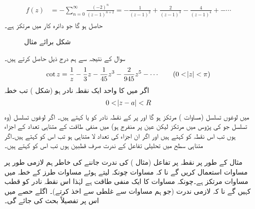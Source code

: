 \begin{gather}
\begin{aligned}\label{مساوات_ٹیلر_چھلا_دوسرا}
f(z)&=-\sum\limits_{n=0}^{\infty} \frac{(-2)^n}{(z-1)^{n+2}}=-\frac{1}{(z-1)^2}+\frac{2}{(z-1)^3}-\frac{4}{(z-1)^4}+-\cdots
\end{aligned}
\end{gather} 
حاصل ہو گا جو دائرہ کار  میں مرتکز ہے۔
%
\begin{figure}
\centering
{}
\caption{شکل برائے مثال }
\label{شکل_مثال_ٹیلر_لوغوں_مثال_ب}
\end{figure}
\quad 
سوال  کے نتیجہ  سے ہم درج ذیل حاصل کرتے ہیں۔
\begin{align*}
\cot z=\frac{1}{z}-\frac{1}{3}z-\frac{1}{45}z^3-\frac{2}{945}z^5-\cdots\quad \quad (0<\abs{z}<\pi)
\end{align*}
اگر  میں   کا واحد ایک نقطہ نادر  ہو (شکل ) تب خطہ
\begin{align}\label{مساوات_ٹیلر_قطب_خطہ}
0<\abs{z-a}<R
\end{align}
میں لوغوں تسلسل (مساوات ) مرتکز ہو گا اور  پر  کے نقطہ نادر کو  یا  کہتے ہیں۔ اگر لوغوں تسلسل (وہ تسلسل جو  کی پڑوس میں مرتکز لیکن عین  پر منفرج ہو) میں منفی طاقت  کے متناہی  تعداد کے اجزاء ہوں تب اس نقطہ کو  کہتے ہیں اور اگر ان اجزاء کی تعداد لا متناہی ہو تب اس کو  کہتے ہیں۔اگر متناہی سطح میں تحلیلی تفاعل کے ندرت صرف قطبین ہوں تب اس کو  کہتے ہیں۔

مثال کے طور پر نقطہ  پر تفاعل  (مثال ) کی ندرت جاننے کی خاطر ہم لازمی طور پر  مساوات  استعمال کریں گے نا کہ مساوات  چونکہ  لیتے ہوئے مساوات  طرز کے خطہ  میں  مساوات  مرتکز ہے۔چونکہ مساوات  کا ایک منفی طاقت ہے لہٰذا اس نقطہ نادر کو قطب کہیں گے نا کہ لازمی ندرت (جو ہم مساوات  سے غلطی سے اخذ کرتے)۔ اگلے حصے میں اس پر تفصیلاً بحث کی جائے گی۔

